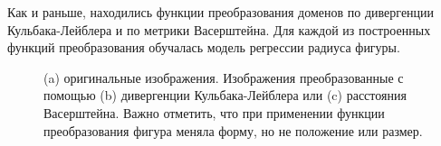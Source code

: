 \documentclass[12pt]{extarticle}
\begin{document}
Как и раньше, находились функции преобразования доменов по дивергенции Кульбака-Лейблера и по метрики Васерштейна. Для каждой из построенных функций преобразования обучалась модель регрессии радиуса фигуры.

\newpage 

\thispagestyle{empty}
\begin{figure}[H]
        \centering
        \qquad
        \qquad
        
        \caption{(a) оригинальные изображения. Изображения преобразованные с помощью (b) дивергенции Кульбака-Лейблера или (c) расстояния Васерштейна. Важно отметить, что при применении функции преобразования фигура меняла форму, но не положение или размер.}
    \end{figure}
\end{document}
